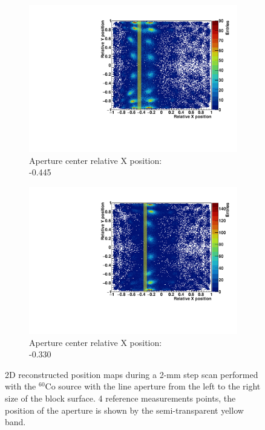 \begin{figure}
\begin{subfigure}[t]{0.5\textwidth}
\centering
\includegraphics[width=\textwidth]{03_GraphicFiles/chapter3_CLaRySproto/Absorber/images_scan/line_2mm/run10_floodMap.pdf}
\caption{Aperture center relative X position: \\ -0.445}
\label{chap3::fig::scan_map3}
\end{subfigure}
\begin{subfigure}[t]{0.5\textwidth}
\centering
\includegraphics[width=\textwidth]{03_GraphicFiles/chapter3_CLaRySproto/Absorber/images_scan/line_2mm/run11_floodMap.pdf}
\caption{Aperture center relative X position: \\ -0.330}
\label{chap3::fig::scan_map4}
\end{subfigure}
\caption{2D reconstructed position maps during a 2-mm step scan performed with the $^{60}$Co source with the line aperture from the left to the right size of the block surface. 4 reference measurements points, the position of the aperture is shown by the semi-transparent yellow band.}
\label{chap3::fig::ScanFloodMap}
\end{figure}

